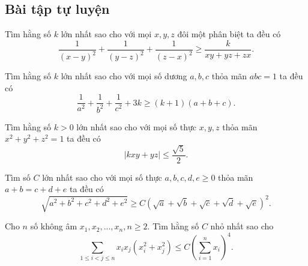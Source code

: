 {\subsection{Bài tập tự luyện}

\begin{bt}%
	Tìm hằng số $k$ lớn nhất sao cho với mọi $x,y,z$ đôi một phân biệt ta đều có
	$$\frac{1}{\left ( x-y \right )^{2}}+\frac{1}{\left ( y-z \right )^{2}}+\frac{1}{\left ( z-x \right )^{2}}\geq \frac{k}{xy+yz+zx}.  $$
\end{bt}

\begin{bt}%
	Tìm hằng số $k$ lớn nhất sao cho với mọi số dương $a,b,c$ thỏa mãn $abc=1$ ta đều có
	$$\frac{1}{a^{2}}+\frac{1}{b^{2}}+\frac{1}{c^{2}}+3k\geq \left ( k+1 \right )\left ( a+b+c \right ).  $$
\end{bt}

\begin{bt}%
	Tìm hằng số $k>0$ lớn nhất sao cho với mọi số thực $x,y,z$ thỏa mãn $x^2+y^2+z^2=1$ ta đều có
	$$\left | kxy+yz \right |\leq \frac{\sqrt{5}}{2}. $$
\end{bt}

\begin{bt} [Iran 2007]%
	Tìm số $C$ lớn nhất sao cho với mọi số thực $a,b,c,d,e\ge 0$ thỏa mãn $a+b=c+d+e$ ta đều có
	$$\sqrt{a^{2}+b^{2}+c^{2}+d^{2}+e^{2} }\geq C\left (\sqrt{a}+\sqrt{b}+ \sqrt{c}+\sqrt{d}+\sqrt{e} \right )^{2}.  $$
\end{bt}
\begin{bt} [IMO 1992]%
	Cho $n$ số không âm $x_1,x_2,...,x_n, n\ge 2.$ Tìm hằng số $C$ nhỏ nhất sao cho 
	$$\sum_{1\leq i<j\leq n}x_{i}x_{j}\left ( x_{i}^{2} +x_{j}^{2}\right )\leq C\left ( \sum_{i=1}^{n}x_{i}\right )^{4}.  $$
\end{bt}

}
